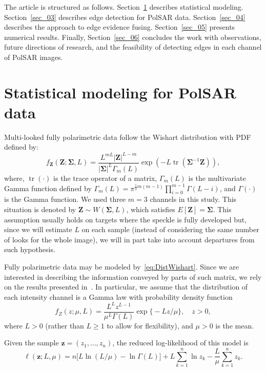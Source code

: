 \documentclass[journal]{IEEEtran}
\DeclareMathOperator{\traco}{tr}
\begin{document}
The article is structured as follows.
Section~\ref{sec_02} describes statistical modeling.
Section~\ref{sec_03} describes edge detection for PolSAR data.
Section~\ref{sec_04} describes the approach to edge evidence fusing.
Section~\ref{sec_05} presents numerical results.
Finally, Section~\ref{sec_06} concludes the work with observations, future directions of research, and the feasibility of detecting edges in each channel of PolSAR images.

\section{Statistical modeling for PolSAR data}\label{sec_02}

Multi-looked fully polarimetric data follow the Wishart distribution with PDF defined by:
\begin{equation}
    f_{\mathbf{Z}}(\mathbf{Z};\mathbf{\Sigma},L)=\frac{L^{mL}|\mathbf{Z}|^{L-m}}{|\mathbf{\Sigma}|^{L}\Gamma_m(L)} \exp(-L\traco(\mathbf{\Sigma}^{-1}\mathbf{Z})),
    \label{eq:DistWishart}
\end{equation} 
where, $\traco(\cdot)$ is the trace operator of a matrix, $\Gamma_m(L)$ is the multivariate Gamma function defined by $
	\Gamma_m(L)=\pi^{\frac{1}{2}m(m-1)} \prod_{i=0}^{m-1}\Gamma(L-i)$,
and $\Gamma(\cdot)$ is the Gamma function.
We used three $m=3$ channels in this study. 
This situation is denoted by $\mathbf{Z}\sim W(\mathbf{\Sigma}, L)$, which satisfies $E[\mathbf{Z}]=\mathbf{\Sigma}$. 
This assumption usually holds on targets where the speckle is fully developed but, since we will estimate $L$ on each sample (instead of considering the same number of looks for the whole image), we will in part take into account departures from such hypothesis.

Fully polarimetric data may be modeled by~\eqref{eq:DistWishart}.
Since we are interested in describing the information conveyed by parts of such matrix, we rely on the results presented in~\cite{lee,hsbmp}.
In particular, we assume that the distribution of each intensity channel is a 
Gamma law with probability density function
\begin{equation}
f_Z(z;\mu,L)=\frac{L^{L}z^{L-1}}{\mu^{L}\Gamma(L)} \exp\big\{-Lz/\mu\big\},\quad z>0,
\label{func_dens_uni_gamma}
\end{equation}
where $L>0$ (rather than $L\geq1$ to allow for flexibility), and
$\mu>0$ is the mean.

Given the sample $\bm z = (z_1,\dots,z_n)$,
the reduced log-likelihood of this model is
\begin{equation}
\ell(\bm z; L,\mu) = 
n \big[L\ln (L / \mu) - \ln \Gamma(L)\big]
+L \sum_{k=1}^{n}\ln z_k -\frac{L}{\mu}\sum_{k=1}^{n} z_k.
\label{eq:LogLikelihoodGamma}
\end{equation}
\end{document}
